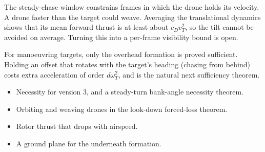 \begin{remark}
The steady-chase window constrains frames in which the drone holds its velocity. A
drone faster than the target could weave. Averaging the translational dynamics shows
that its mean forward thrust is at least about $c_Dv_T^2$, so the tilt cannot be
avoided on average. Turning this into a per-frame visibility bound is open.
\end{remark}

\begin{remark}
For manoeuvring targets, only the overhead formation is proved sufficient. Holding
an offset that rotates with the target's heading (chasing from behind) costs extra
acceleration of order $d\omega_T^2$, and is the natural next sufficiency theorem.
\end{remark}

\begin{remark}
\begin{itemize}
  \item Necessity for version 3, and a steady-turn bank-angle necessity theorem.
  \item Orbiting and weaving drones in the look-down forced-loss theorem.
  \item Rotor thrust that drops with airspeed.
  \item A ground plane for the underneath formation.
\end{itemize}
\end{remark}
